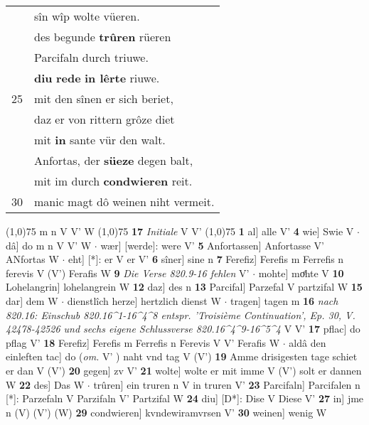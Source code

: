 \documentclass[8pt,a4paper,notitlepage]{article}
\begin{document}
\begin{table}[ht]
\begin{minipage}[t]{0.5\linewidth}
\begin{tabular}{rl}
 & sîn wîp wolte vüeren.\\ 
 & des begunde \textbf{trûren} rüeren\\ 
 & Parcifaln durch triuwe.\\ 
 & \textbf{diu} \textbf{rede} \textbf{in lêrte} riuwe.\\ 
25 & mit den sînen er sich beriet,\\ 
 & daz er von rittern grôze diet\\ 
 & mit \textbf{in} sante vür den walt.\\ 
 & Anfortas, der \textbf{süeze} degen balt,\\ 
 & mit im durch \textbf{condwieren} reit.\\ 
30 & manic magt dô weinen niht vermeit.\\ 
\end{tabular}
\scriptsize
\line(1,0){75} \newline
m n V V' W \newline
\line(1,0){75} \newline
\textbf{17} \textit{Initiale} V V'  \newline
\line(1,0){75} \newline
\textbf{1} al] alle V' \textbf{4} wie] Swie V  $\cdot$ dâ] do m n V V' W  $\cdot$ wær] [werde]: were V' \textbf{5} Anfortassen] Anfortasse V' ANfortas W  $\cdot$ eht] [*]: er V er V' \textbf{6} sîner] sine n \textbf{7} Ferefiz] Ferefis m Ferrefis n ferevis V (V') Ferafis W \textbf{9} \textit{Die Verse 820.9-16 fehlen} V'   $\cdot$ mohte] moͤhte V \textbf{10} Lohelangrin] lohelangrein W \textbf{12} daz] des n \textbf{13} Parcifal] Parzefal V partzifal W \textbf{15} dar] dem W  $\cdot$ dienstlîch herze] hertzlich dienst W  $\cdot$ tragen] tagen m \textbf{16} \textit{nach 820.16: Einschub 820.16\textasciicircum1-16\textasciicircum4\textasciicircum8 entspr. 'Troisième Continuation', Ep. 30, V. 42478-42526 und sechs eigene Schlussverse 820.16\textasciicircum4\textasciicircum9-16\textasciicircum5\textasciicircum4} V V'  \textbf{17} pflac] do pflag V' \textbf{18} Ferefiz] Ferefis m Ferrefis n Ferevis V V' Ferafis W  $\cdot$ aldâ den einleften tac] do (\textit{om.} V' ) naht vnd tag V (V') \textbf{19} Amme drisigesten tage schiet er dan V (V') \textbf{20} gegen] zv V' \textbf{21} wolte] wolte er mit imme V (V') solt er dannen W \textbf{22} des] Das W  $\cdot$ trûren] ein truren n V in truren V' \textbf{23} Parcifaln] Parcifalen n [*]: Parzefaln V Parzifaln V' Partzifal W \textbf{24} diu] [D*]: Dise V Diese V' \textbf{27} in] jme n (V) (V') (W) \textbf{29} condwieren] kvndewiramvrsen V' \textbf{30} weinen] wenig W \newline
\end{minipage}
\end{table}
\end{document}
